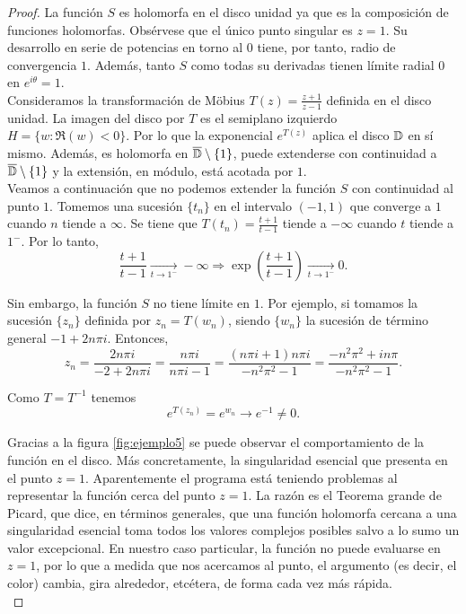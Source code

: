\begin{proof}
    La función $S$ es holomorfa en el disco unidad ya que es la composición de funciones holomorfas. Obsérvese que el único punto singular es $z = 1$. Su desarrollo en serie de potencias en torno al $0$ tiene, por tanto, radio de convergencia $1$. Además, tanto $S$ como todas su derivadas tienen límite radial 0 en $e^{i \theta} = 1$. \\

    Consideramos la transformación de Möbius $T(z) = \frac{z + 1}{z - 1}$ definida en el disco unidad. La imagen del disco por $T$ es el semiplano izquierdo $H = \{w: \Re (w) < 0\}$. Por lo que la exponencial $e^{T(z)}$ aplica el disco $\mathbb{D}$ en sí mismo. Además, es holomorfa en $\overline{\mathbb{D}} \setminus \{1\}$, puede extenderse con continuidad a $\overline{\mathbb{D}} \setminus \{1\}$ y la extensión, en módulo, está acotada por $1$. \\

    Veamos a continuación que no podemos extender la función $S$ con continuidad al punto $1$. Tomemos una sucesión $\{t_n\}$ en el intervalo $(-1,1)$ que converge a $1$ cuando $n$ tiende a $\infty$. Se tiene que $T(t_n)  = \frac{t + 1}{t - 1}$ tiende a $- \infty$ cuando $t$ tiende a $1^-$. Por lo tanto,
    \begin{equation*}
        \frac{t + 1}{t - 1} \xrightarrow[t \to 1^-]{}  - \infty \Rightarrow \exp \left(  \frac{t + 1}{t - 1} \right) \xrightarrow[t \to 1^-]{} 0.
    \end{equation*}

    Sin embargo, la función $S$ no tiene límite en $1$. Por ejemplo, si tomamos la sucesión $\{z_n\}$ definida por $z_n = T(w_n)$, siendo $\{w_n\}$ la sucesión de término general $-1 + 2n \pi i$. Entonces,
    \begin{equation*}
        z_n = \frac{2n \pi i}{-2 + 2n \pi i} = \frac{n \pi i}{n \pi i - 1} =  \frac{(n \pi i + 1) n \pi i}{- n^2 \pi^2 - 1} = \frac{-n^2 \pi^2 + i n \pi}{-n^2 \pi^2 - 1}.
    \end{equation*}

    Como $T = T^{-1}$ tenemos
    \begin{equation*}
        e^{T(z_n)} = e^{w_n} \to e^{-1} \not = 0.
    \end{equation*}

    Gracias a la figura \ref{fig:ejemplo5} se puede observar el comportamiento de la función en el disco. Más concretamente, la singularidad esencial que presenta en el punto $z = 1$. Aparentemente el programa está teniendo problemas al representar la función cerca del punto $z=1$. La razón es el Teorema grande de Picard, que dice, en términos generales, que una función holomorfa cercana a una singularidad esencial toma todos los valores complejos posibles salvo a lo sumo un valor excepcional. En nuestro caso particular, la función no puede evaluarse en $z=1$, por lo que a medida que nos acercamos al punto, el argumento (es decir, el color) cambia, gira alrededor, etcétera, de forma cada vez más rápida. \\


\end{proof}
